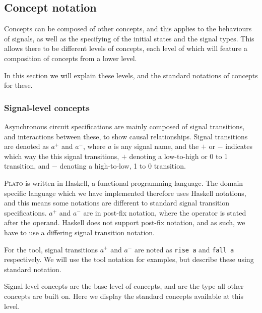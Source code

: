 \documentclass[british,conference,compsoc]{IEEEtran}
\newcommand{\noun}[1]{\textsc{#1}}
\begin{document}
\vspace{-3mm}

\subsection{Concept notation \label{sub:concept-notation}}

\vspace{-3mm}

Concepts can be composed of other concepts, and this applies to the behaviours 
of signals, as well as the specifying of the initial states and the signal 
types. This allows there to be different levels of concepts, each level of 
which will feature a composition of concepts from a lower level. 

In this section we will explain these levels, and the standard notations of 
concepts for these. 

\vspace{-2mm}

\subsubsection{\label{signal-level}Signal-level concepts}Asynchronous circuit 
specifications are mainly composed of signal transitions, and interactions 
between these, to show causal relationships. Signal transitions are denoted as 
$a^{+}$ and $a^{-}$, where $a$ is any signal name, and 
the $+$ or $-$ indicates which way the this signal transitions, $+$ denoting a 
low-to-high or 0 to 1 transition, and $-$ denoting a high-to-low, 1 to 0 
transition. 

\noun{Plato} is written in Haskell, a functional programming language. The 
domain specific language which we have implemented therefore uses Haskell 
notations, and this means some notations are different to standard signal 
transition specifications. $a^{+}$ and $a^{-}$ are in post-fix notation, where 
the operator is stated after the operand. Haskell does not support post-fix 
notation, and as such, we have to use a differing signal transition notation. 

For the tool, signal transitions $a^{+}$ and $a^{-}$ are noted as \texttt{rise a} and 
\texttt{fall a} respectively. We will use the tool notation for examples, but 
describe these using standard notation.

Signal-level concepts are the base level of concepts, and are 
the type all other concepts are built on. Here we display the standard concepts
available at this level.
\end{document}
